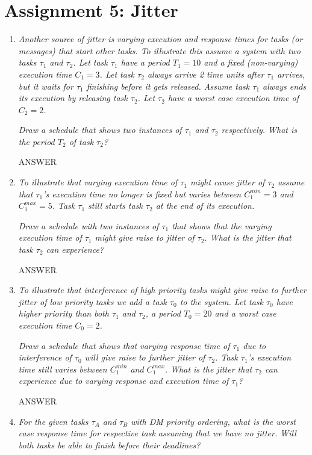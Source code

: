 \documentclass[a4paper,10pt]{article}
\begin{document}
\section{Assignment 5: Jitter}

\begin{enumerate}
	\item \emph{Another source of jitter is varying execution and response times for tasks (or messages) that start other tasks. To illustrate this assume a system with two tasks $\tau_1$ and $\tau_2$. Let task $\tau_1$ have a period $T_1 = 10$ and a fixed (non-varying) execution time $C_1 = 3$. Let task $\tau_2$ always arrive 2 time units after $\tau_1$ arrives, but it waits for $\tau_1$ finishing before it gets released. Assume task $\tau_1$ always ends its execution by releasing task $\tau_2$. Let $\tau_2$ have a worst case execution time of $C_2 = 2$.}
	
	\emph{Draw a schedule that shows two instances of $\tau_1$ and $\tau_2$ respectively. What is the period $T_2$ of task $\tau_2$?}
	
	ANSWER
	\item \emph{To illustrate that varying execution time of $\tau_1$ might cause jitter of $\tau_2$ assume that $\tau_1$'s execution time no longer is fixed but varies between $C_1^{min} = 3$ and $C_1^{max} = 5$. Task $\tau_1$ still starts task $\tau_2$ at the end of its execution.}

	\emph{Draw a schedule with two instances of $\tau_1$ that shows that the varying execution time of $\tau_1$ might give raise to jitter of $\tau_2$. What is the jitter that task $\tau_2$ can experience?}
	
	ANSWER
	\item \emph{To illustrate that interference of high priority tasks might give raise to further jitter of low priority tasks we add a task $\tau_0$ to the system. Let task $\tau_0$ have higher priority than both $\tau_1$ and $\tau_2$, a period $T_0 = 20$ and a worst case execution time $C_0 = 2$.}
	
	\emph{Draw a schedule that shows that varying response time of $\tau_1$ due to interference of $\tau_0$ will give raise to further jitter of $\tau_2$. Task $\tau_1$'s execution time still varies between $C_1^{min}$ and $C_1^{max}$. What is the jitter that $\tau_2$ can experience due to varying response and execution time of $\tau_1$?}
	
	ANSWER
	\item \emph{For the given tasks $\tau_A$ and $\tau_B$ with DM priority ordering, what is the worst case response time for respective task assuming that we have no jitter. Will both tasks be able to finish before their deadlines?}
	

\end{enumerate}
\end{document}
